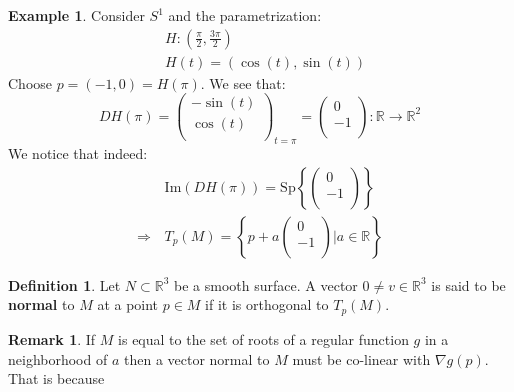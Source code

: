 \documentclass[11pt,a4paper]{article}
\theoremstyle{definition}
\newtheorem{definition}{Definition}[section]
\newtheorem{remark}{Remark}[section]
\newtheorem{example}{Example}[section]
\theoremstyle{plain}
\newcommand{\R}{\mathbb{R}}
\begin{document}
	\begin{example}
		Consider $S^1$ and the parametrization:
		\begin{align*}
			&H \colon \left(\frac{\pi}{2}, \frac{3\pi}{2}\right) \\
			&H(t) = (\cos(t), \sin(t))
		\end{align*}
		Choose $p = (-1,0) = H(\pi)$. We see that:
		\[
			DH(\pi) = 
			\begin{pmatrix}
				-\sin(t)\\
				\cos(t)\\
			\end{pmatrix}_{t=\pi} = 
			\begin{pmatrix}
				0\\
				-1\\
			\end{pmatrix} \colon \R \to \R^2
		\]
		We notice that indeed:
		\begin{align*}
			&\mathrm{Im}(DH(\pi)) = \mathrm{Sp}
			\left\{\begin{pmatrix}
				0\\
				-1\\
			\end{pmatrix}\right\} \\
			\Rightarrow \,&T_p(M) =
			\left\{p + a\begin{pmatrix}
				0\\
				-1\\
			\end{pmatrix} \biggr\vert a \in \R \right\}
		\end{align*}
	\end{example}
	\begin{definition}
		Let $N \subset \R^3$ be a smooth surface. A vector 
		$0 \neq v \in \R^3$ is said to be \textbf{normal} to $M$ at a 
		point $p \in M$ if it is orthogonal to $T_p(M)$.
	\end{definition}
	\begin{remark}
		If $M$ is equal to the set of roots of a regular function $g$
		in a neighborhood of $a$ then a vector normal to $M$ must be 
		co-linear with $\nabla g(p)$. 
		 That is because
	\end{remark}
	
	\newpage
	
\end{document}
